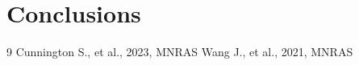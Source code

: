 \documentclass[a4paper,fleqn,usenatbib]{mnras}
\begin{document}
\section{Conclusions}


\begin{thebibliography}{9}
Cunnington S., et al., 2023, MNRAS %
Wang J., et al., 2021, MNRAS %
\end{thebibliography}
\end{document}
